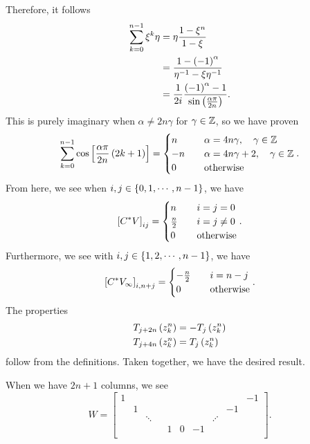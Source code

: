 Therefore, it follows
%
\begin{align}
    \sum_{k=0}^{n-1}\xi^{k}\eta &= \eta\frac{1 - \xi^{n}}{1 - \xi} \nonumber\\
     &= \frac{1 - \left( -1 \right)^{\alpha}}{\eta^{-1} - \xi\eta^{-1}} \nonumber\\
     &= \frac{1}{2i}\frac{\left( -1 \right)^{\alpha} - 1}{
                \sin\left( \frac{\alpha\pi}{2n} \right)}.
\end{align}
%
This is purely imaginary when $\alpha\ne 2n\gamma$
for $\gamma\in\mathbb{Z}$, so we have proven
%
\begin{equation}
\sum_{k=0}^{n-1} \cos\left[ \frac{\alpha\pi}{2n}\left( 2k + 1 \right) \right]
 = \begin{cases}
    n &\quad \alpha = 4n\gamma, \quad \gamma\in\mathbb{Z} \\
    -n &\quad \alpha = 4n\gamma + 2, \quad \gamma\in\mathbb{Z} \\
    0 &\quad\text{otherwise}
\end{cases}.
\end{equation}
%
From here, we see when $i,j\in\left\{ 0,1,\cdots,n-1 \right\}$, we have
%
\begin{equation}
\left[ C^{*}V \right]_{ij} = \begin{cases}
    n &\quad i = j = 0 \\
    \frac{n}{2} &\quad i = j \ne 0 \\
    0 &\quad \text{otherwise}
\end{cases}.
\end{equation}
%
Furthermore, we see with $i,j\in\left\{ 1,2,\cdots,n-1 \right\}$, we have
%
\begin{equation}
\left[ C^{*}V_{\infty} \right]_{i,n+j} = \begin{cases}
    -\frac{n}{2} &\quad i = n - j \\
    0 &\quad \text{otherwise}
\end{cases}.
\end{equation}
%
The properties
%
\begin{align}
T_{j + 2n}\left( z_{k}^{n} \right) &= -T_{j}\left( z_{k}^{n} \right) \nonumber \\ 
T_{j + 4n}\left( z_{k}^{n} \right) &= T_{j}\left( z_{k}^{n} \right)
\end{align}
%
follow from the definitions.
Taken together, we have the desired result.

When we have $2n+1$ columns, we see
%
\begin{equation}
    W = \begin{bmatrix}
            1 &   &   &   &   &   &   &   &   & -1 \\
              & 1 &   &   &   &   &   &   & -1& \\
             & &\ddots&   &   &   &  &\iddots&& \\
              &   &   &   & 1 & 0 & -1&   &   & \\
        \end{bmatrix}.
\end{equation}

